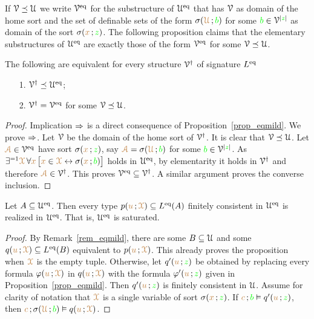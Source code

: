 \documentclass[creche.tex]{subfiles}
\begin{document}
If $\EuScript V\preceq\EuScript U$ we write \emph{$\EuScript V^{{{\rm eq}}}$\/} for the substructure of $\EuScript U^{{\rm eq}}$ that has $\EuScript V$ as domain of the home sort and  the set of definable sets of the form $\sigma({\color{brown}\EuScript U}\,;{\color{green} b})$ for some ${\color{green} b}\in \EuScript V^{|{\color{green} z}|}$ as domain of the sort $\sigma({\color{brown} x}\,;{\color{green} z})$.
The following proposition claims that the elementary substructures of $\EuScript U^{{\rm eq}}$ are exactly those of the form $\EuScript V^{{\rm eq}}$ for some $\EuScript V\preceq\EuScript U$.

\begin{proposition}
The following are equivalent for every structure $\EuScript V^\dag$ of signature $L^{{\rm eq}}$
\begin{itemize}
\item[1.] $\EuScript V^\dag\preceq\EuScript U^{{\rm eq}}$;
\item[2.] $\EuScript V^\dag=\EuScript V^{{\rm eq}}$ for some $\EuScript V\preceq\EuScript U$.
\end{itemize}
\end{proposition}
\begin{proof}
Implication $\Rightarrow$ is a direct consequence of Proposition~\ref{prop_eqmild}.
We prove $\Rightarrow$.
Let $\EuScript V$ be the domain of the home sort of $\EuScript V^\dag$.
It is clear that $\EuScript V\preceq\EuScript U$.
Let ${\color{brown}\EuScript A}\in\EuScript V^{{\rm eq}}$  have sort $\sigma({\color{brown} x}\,;{\color{green} z})$, say ${\color{brown}\EuScript A}=\sigma({\color{brown}\EuScript U}\,;{\color{green} b})$ for some ${\color{green} b}\in\EuScript V^{|{\color{green} z}|}$.
As $\exists^{=1}{\color{brown}\EuScript X}\, \forall{\color{brown}x}\,\big[{\color{brown} x}\in{\color{brown}\EuScript X}\leftrightarrow\sigma({\color{brown} x}\,;{\color{green} b})\big]$ holds in $\EuScript U^{{\rm eq}}$, by elementarity it holds in $\EuScript V^\dag$ and therefore ${\color{brown}\EuScript A}\in\EuScript V^\dag$.
This proves $\EuScript V^{{\rm eq}}\subseteq\EuScript V^\dag$.
A similar argument proves the converse inclusion.
\end{proof}

\begin{proposition}\label{prop_Ueq_saturated}
Let $A\subseteq\EuScript U^{{\rm eq}}$.
Then every type $p({\color{brown} u}\,;{\color{brown}\EuScript X})\subseteq L^{{\rm eq}}(A)$ finitely consistent in $\EuScript U^{{\rm eq}}$ is realized in $\EuScript U^{{\rm eq}}$.
That is, $\EuScript U^{{\rm eq}}$ is saturated.
\end{proposition}
\begin{proof}
By Remark~\ref{rem_eqmild}, there are some $B\subseteq\EuScript U$ and some $q({\color{brown} u}\,;{\color{brown}\EuScript X})\subseteq L^{{\rm eq}}(B)$ equivalent to $p({\color{brown} u}\,;{\color{brown}\EuScript X})$.
This already proves the proposition when ${\color{brown}\EuScript X}$ is the empty tuple.
Otherwise, let $q'({\color{brown} u}\,;{\color{green} z})$ be obtained by replacing every formula $\varphi({\color{brown} u}\,;{\color{brown}\EuScript X})$ in $q({\color{brown} u}\,;{\color{brown}\EuScript X})$ with the formula $\varphi'({\color{brown} u}\,;{\color{green} z})$ given in Proposition~\ref{prop_eqmild}.
Then $q'({\color{brown} u}\,;{\color{green} z})$ is finitely consistent in $\EuScript U$.
Assume for clarity of notation that ${\color{brown}\EuScript X}$ is a single variable of sort $\sigma({\color{brown} x}\,;{\color{green} z})$.
If ${\color{brown} c}\,;{\color{green} b}\vDash q'({\color{brown} u}\,;{\color{green} z})$, then  ${\color{brown} c}\,;\sigma({\color{brown}\EuScript U}\,;{\color{green} b})\vDash q({\color{brown} u}\,;{\color{brown}\EuScript X})$.
\end{proof}
\end{document}
